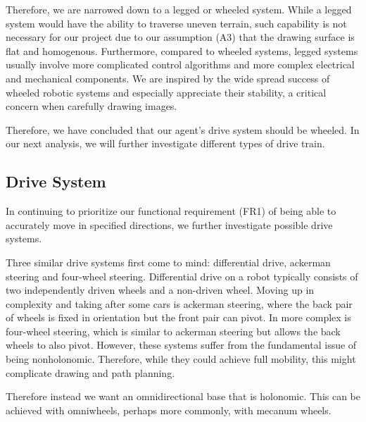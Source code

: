 Therefore, we are narrowed down to a legged or wheeled system. While a legged system would have the ability to traverse uneven terrain, such capability is not necessary for our project due to our assumption (A3) that the drawing surface is flat and homogenous. Furthermore, compared to wheeled systems, legged systems usually involve more complicated control algorithms and more complex electrical and mechanical components. We are inspired by the wide spread success of wheeled robotic systems and especially appreciate their stability, a critical concern when carefully drawing images.

Therefore, we have concluded that our agent's drive system should be wheeled. In our next analysis, we will further investigate different types of drive train. 

\subsection{Drive System}
\label{sec:trade_drive}


In continuing to prioritize our functional requirement (FR1) of being able to accurately move in specified directions, we further investigate possible drive systems. 

Three similar drive systems first come to mind: differential drive, ackerman steering and four-wheel steering. Differential drive on a robot typically consists of two independently driven wheels and a non-driven wheel. Moving up in complexity and taking after some cars is ackerman steering, where the back pair of wheels is fixed in orientation but the front pair can pivot. In more complex is four-wheel steering, which is similar to ackerman steering but allows the back wheels to also pivot. However, these systems suffer from the fundamental issue of being nonholonomic. Therefore, while they could achieve full mobility, this might complicate drawing and path planning. 

Therefore instead we want an omnidirectional base that is holonomic. This can be achieved with omniwheels, perhaps more commonly, with mecanum wheels. 


